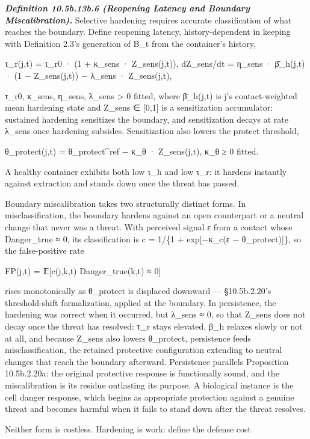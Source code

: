 \documentclass[
]{article}
\begin{document}
\emph{\textbf{Definition 10.5b.13b.6 (Reopening Latency and Boundary
Miscalibration).}} Selective hardening requires accurate classification
of what reaches the boundary. Define reopening latency, history-dependent
in keeping with Definition 2.3's generation of B\_t from the container's
history,

τ\_r(j,t) = τ\_r0 · (1 + κ\_sens · Z\_sens(j,t)),
dZ\_sens/dt = η\_sens · β̄\_h(j,t) · (1 − Z\_sens(j,t)) − λ\_sens ·
Z\_sens(j,t),

τ\_r0, κ\_sens, η\_sens, λ\_sens \textgreater{} 0 fitted, where
β̄\_h(j,t) is j's contact-weighted mean hardening state and Z\_sens ∈
{[}0,1{]} is a sensitization accumulator: sustained hardening sensitizes
the boundary, and sensitization decays at rate λ\_sens once hardening
subsides. Sensitization also lowers the protect threshold,

θ\_protect(j,t) = θ\_protect\^{}ref − κ\_θ · Z\_sens(j,t), κ\_θ ≥ 0
fitted.

A healthy container exhibits both low τ\_h and low τ\_r: it hardens
instantly against extraction and stands down once the threat has passed.

Boundary miscalibration takes two structurally distinct forms. In
misclassification, the boundary hardens against an open counterpart or
a neutral change that never was a threat. With perceived signal ε from a
contact whose Danger\_true ≈ 0, its classification is c = 1/\{1 +
exp{[}−κ\_c(ε − θ\_protect){]}\}, so the false-positive rate

FP(j,t) = 𝔼{[}c(j,k,t) \textbar{} Danger\_true(k,t) ≈ 0{]}

rises monotonically as θ\_protect is displaced downward --- §10.5b.2.20's
threshold-shift formalization, applied at the boundary. In persistence,
the hardening was correct when it occurred, but λ\_sens ≈ 0, so that
Z\_sens does not decay once the threat has resolved: τ\_r stays elevated,
β\_h relaxes slowly or not at all, and because Z\_sens also lowers
θ\_protect, persistence feeds misclassification, the retained protective
configuration extending to neutral changes that reach the boundary
afterward. Persistence parallels Proposition 10.5b.2.20a: the original
protective response is functionally sound, and the miscalibration is its
residue outlasting its purpose. A biological instance is the cell danger
response, which begins as appropriate protection against a genuine
threat and becomes harmful when it fails to stand down after the threat
resolves.

Neither form is costless. Hardening is work: define the defense cost
\end{document}
